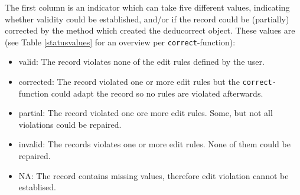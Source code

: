 \documentclass[11pt, fleqn, a4paper]{article}
\begin{document}
The first column is an indicator which can take five different values,
indicating whether validity could be established, and/or if the record could be
(partially) corrected by the method which created the deducorrect object.  These
values are (see Table \ref{statusvalues} for an overview per {\tt correct}-function):
\begin{itemize}
\item{\sf valid}: The record violates none of the edit rules defined by the user.
\item{\sf corrected}: The record violated one or more edit rules but the {\tt correct-} function
    could adapt the record so no rules are violated afterwards.
\item{\sf partial}: The record violated one ore more edit rules. Some, but not all violations
    could be repaired.
\item{\sf invalid}: The records violates one or more edit rules. None of them could be repaired.
\item{\sf NA}: The record contains missing values, therefore edit violation cannot be establised.
\end{itemize}
%
%
\end{document}
